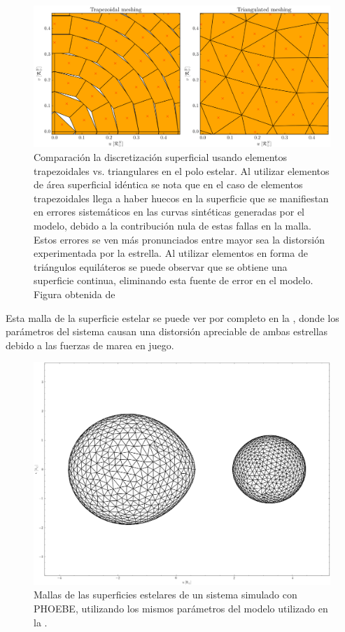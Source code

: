 \begin{figure}[!ht]
	\includegraphics[scale=0.45]{Introduccion/Figures/Figura Mallado Triangular_PHOEBE II Mesh.png}
	\caption{Comparación la discretización superficial usando elementos
	trapezoidales vs. triangulares en el polo estelar. Al utilizar elementos de
	área superficial idéntica se nota que en el caso de elementos trapezoidales
	llega a haber huecos en la superficie que se manifiestan en errores
	sistemáticos en las curvas sintéticas generadas por el modelo, debido a la
	contribución nula de estas fallas en la malla. Estos errores se ven más
	pronunciados entre mayor sea la distorsión experimentada por la estrella. Al
	utilizar elementos en forma de triángulos equiláteros se puede observar que
	se obtiene una superficie continua, eliminando esta fuente de error en el
	modelo. Figura obtenida de
	\autocite{prsa_phoebe_increased_model_fidelity_mesh_2016}}
	\label{figuraMallaPhoebe}
\end{figure}

Esta malla de la superficie estelar se puede ver por completo en la
, donde los parámetros del sistema causan una
distorsión apreciable de ambas estrellas debido a las fuerzas de marea en juego.

\begin{figure}[!ht]
	\centering
	\includegraphics[scale=0.42]{Introduccion/Figures/Figura PHOEBE Malla.png}
	\caption{Mallas de las superficies estelares de un sistema simulado con
	PHOEBE, utilizando los mismos parámetros del modelo utilizado en la
	.}
	\label{figuraPhoebeMalla}
\end{figure}

